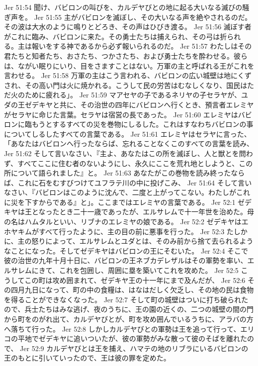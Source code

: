 Jer 51:54  聞け、バビロンの叫びを、カルデヤびとの地に起る大いなる滅びの騒ぎ声を。
Jer 51:55  主がバビロンを滅ぼし、その大いなる声を絶やされるのだ。その波は大水のように鳴りとどろき、その声はひびき渡る。
Jer 51:56  滅ぼす者がこれに臨み、バビロンに来た。その勇士たちは捕えられ、その弓は折られる。主は報いをする神であるから必ず報いられるのだ。
Jer 51:57  わたしはその君たちと知者たち、おさたち、つかさたち、および勇士たちを酔わせる。彼らは、ながい眠りにいり、目をさますことはない。万軍の主と呼ばれる王がこれを言わせる。
Jer 51:58  万軍の主はこう言われる、バビロンの広い城壁は地にくずされ、その高い門は火に焼かれる。こうして民の労苦はむなしくなり、国民はただ火のために疲れる」。
Jer 51:59  マアセヤの子であるネリヤの子セラヤが、ユダの王ゼデキヤと共に、その治世の四年にバビロンへ行くとき、預言者エレミヤがセラヤに命じた言葉。セラヤは宿営の長であった。
Jer 51:60  エレミヤはバビロンに臨もうとするすべての災を巻物にしるした。これはすなわちバビロンの事についてしるしたすべての言葉である。
Jer 51:61  エレミヤはセラヤに言った、「あなたはバビロンへ行ったならば、忘れることなくこのすべての言葉を読み、
Jer 51:62  そして言いなさい、『主よ、あなたはこの所を滅ぼし、人と獣とを問わず、すべてここに住む者のないようにし、永久にここを荒れ地としようと、この所について語られました』と。
Jer 51:63  あなたがこの巻物を読み終ったならば、これに石をむすびつけてユフラテ川の中に投げこみ、
Jer 51:64  そして言いなさい、『バビロンはこのように沈んで、二度と上がってこない。わたしがこれに災を下すからである』と」。ここまではエレミヤの言葉である。
Jer 52:1  ゼデキヤは王となったとき二十一歳であったが、エルサレムで十一年世を治めた。母の名はハムタルといい、リブナのエレミヤの娘である。
Jer 52:2  ゼデキヤはエホヤキムがすべて行ったように、主の目の前に悪事を行った。
Jer 52:3  たしかに、主の怒りによって、エルサレムとユダとは、そのみ前から捨て去られるようなことになった。そしてゼデキヤはバビロンの王にそむいた。
Jer 52:4  そこで彼の治世の九年十月十日に、バビロンの王ネブカデレザルはその軍勢を率い、エルサレムにきて、これを包囲し、周囲に塁を築いてこれを攻めた。
Jer 52:5  こうしてこの町は攻め囲まれて、ゼデキヤ王の十一年にまで及んだが、
Jer 52:6  その四月九日になって、町の中の食糧は、はなはだしく欠乏し、その地の民は食物を得ることができなくなった。
Jer 52:7  そして町の城壁はついに打ち破られたので、兵士たちはみな逃げ、夜のうちに、王の園の近くの、二つの城壁の間の門から町をのがれ出て、カルデヤびとが、町を攻め囲んでいるうちに、アラバの方へ落ちて行った。
Jer 52:8  しかしカルデヤびとの軍勢は王を追って行って、エリコの平地でゼデキヤに追いついたが、彼の軍勢がみな散って彼のそばを離れたので、
Jer 52:9  カルデヤびとは王を捕え、ハマテの地のリブラにいるバビロンの王のもとに引いていったので、王は彼の罪を定めた。
